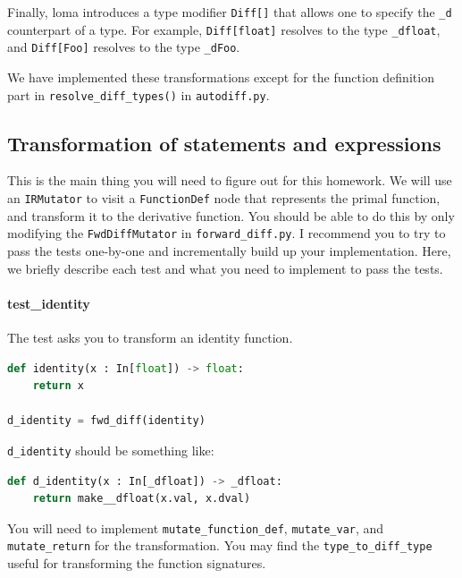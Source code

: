 Finally, loma introduces a type modifier \lstinline{Diff[]} that allows one to specify the \lstinline{_d} counterpart of a type. For example, \lstinline{Diff[float]} resolves to the type \lstinline{_dfloat}, and \lstinline{Diff[Foo]} resolves to the type \lstinline{_dFoo}. 

We have implemented these transformations except for the function definition part in \lstinline{resolve_diff_types()} in \lstinline{autodiff.py}.

\subsection{Transformation of statements and expressions}
This is the main thing you will need to figure out for this homework. We will use an \lstinline{IRMutator} to visit a \lstinline{FunctionDef} node that represents the primal function, and transform it to the derivative function. You should be able to do this by only modifying the \lstinline{FwdDiffMutator} in \lstinline{forward_diff.py}. I recommend you to try to pass the tests one-by-one and incrementally build up your implementation. Here, we briefly describe each test and what you need to implement to pass the tests.

\paragraph{test_identity} The test asks you to transform an identity function.
\begin{lstlisting}[language=Python]
def identity(x : In[float]) -> float:
    return x

d_identity = fwd_diff(identity)
\end{lstlisting}
\lstinline{d_identity} should be something like:
\begin{lstlisting}[language=Python]
def d_identity(x : In[_dfloat]) -> _dfloat:
    return make__dfloat(x.val, x.dval)
\end{lstlisting}
You will need to implement \lstinline{mutate_function_def}, \lstinline{mutate_var}, and \lstinline{mutate_return} for the transformation. You may find the \lstinline{type_to_diff_type} useful for transforming the function signatures. 

